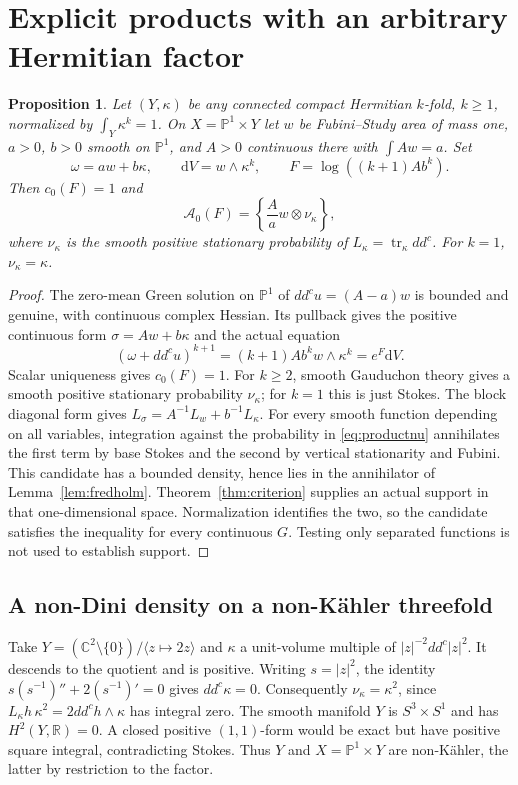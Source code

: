 \documentclass[11pt]{article}
\newcommand{\ddc}{dd^c}
\newcommand{\tr}{\operatorname{tr}}
\newcommand{\cA}{\mathcal A}
\newcommand{\dV}{\mathrm dV}
\newtheorem{proposition}[theorem]{Proposition}
\theoremstyle{remark}
\begin{document}
\section{Explicit products with an arbitrary Hermitian factor}
\begin{proposition}\label{prop:product}
Let $(Y,\kappa)$ be any connected compact Hermitian $k$-fold, $k\geq1$,
normalized by $\int_Y\kappa^k=1$. On $X=\mathbb P^1\times Y$ let
$w$ be Fubini--Study area of mass one, $a>0$, $b>0$ smooth on
$\mathbb P^1$, and $A>0$ continuous there with $\int A w=a$.
Set
\[
 \omega=aw+b\kappa,\qquad \dV=w\wedge\kappa^k,
 \qquad F=\log((k+1)Ab^k).
\]
Then $c_0(F)=1$ and
\begin{equation}\label{eq:productnu}
 \cA_0(F)=\left\{\frac A a w\otimes\nu_\kappa\right\},
\end{equation}
where $\nu_\kappa$ is the smooth positive stationary probability of
$L_\kappa=\tr_\kappa\ddc$. For $k=1$, $\nu_\kappa=\kappa$.
\end{proposition}
\begin{proof}
The zero-mean Green solution on $\mathbb P^1$ of
$\ddc u=(A-a)w$ is bounded and genuine, with continuous complex Hessian.
Its pullback gives the positive continuous form
$\sigma=Aw+b\kappa$ and the actual equation
\[
 (\omega+\ddc u)^{k+1}=(k+1)Ab^k w\wedge\kappa^k=e^F\dV.
\]
Scalar uniqueness gives $c_0(F)=1$. For $k\geq2$, smooth
Gauduchon theory \cite[Theorem 2]{Gaud} gives a smooth positive
stationary probability $\nu_\kappa$; for $k=1$ this is just Stokes.
The block diagonal form gives
$L_\sigma=A^{-1}L_w+b^{-1}L_\kappa$.
For every smooth function depending on all variables, integration against
the probability in \eqref{eq:productnu} annihilates the first term by
base Stokes and the second by vertical stationarity and Fubini.
This candidate has a bounded density, hence lies in the annihilator of
Lemma~\ref{lem:fredholm}. Theorem~\ref{thm:criterion} supplies an actual
support in that one-dimensional space. Normalization identifies the two,
so the candidate satisfies the inequality for every continuous $G$.
Testing only separated functions is not used to establish support.
\end{proof}

\subsection{A non-Dini density on a non-K\"ahler threefold}
Take $Y=(\mathbb C^2\setminus\{0\})/\langle z\mapsto2z\rangle$ and
$\kappa$ a unit-volume multiple of $|z|^{-2}\ddc|z|^2$.
It descends to the quotient and is positive. Writing $s=|z|^2$,
the identity $s(s^{-1})''+2(s^{-1})'=0$ gives $\ddc\kappa=0$.
Consequently $\nu_\kappa=\kappa^2$, since
$L_\kappa h\,\kappa^2=2\ddc h\wedge\kappa$ has integral zero.
The smooth manifold $Y$ is $S^3\times S^1$ and has $H^2(Y,\mathbb R)=0$.
A closed positive $(1,1)$-form would be exact but have positive square
integral, contradicting Stokes. Thus $Y$ and $X=\mathbb P^1\times Y$
are non-K\"ahler, the latter by restriction to the factor.
\end{document}
